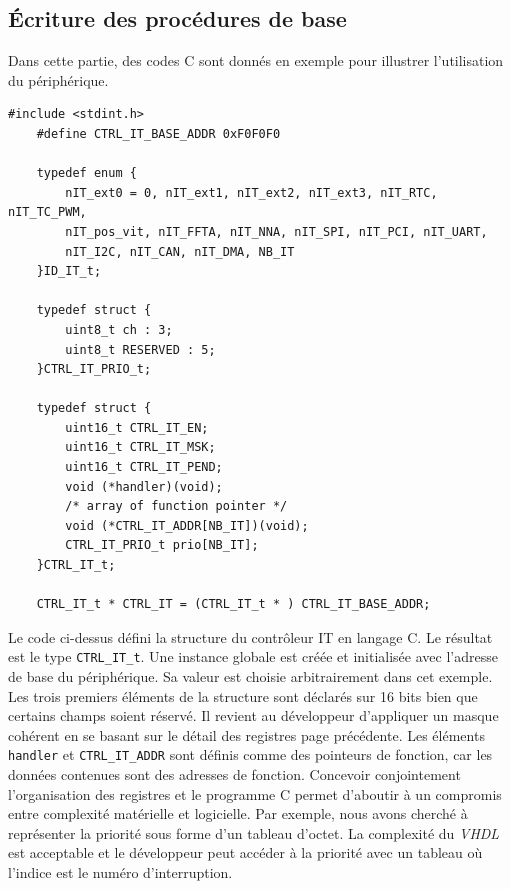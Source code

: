 \subsection{Écriture des procédures de base}
Dans cette partie, des codes C sont donnés en exemple pour illustrer l'utilisation du périphérique.
\begin{lstlisting}[style=CStyle]
	#include <stdint.h>
	#define CTRL_IT_BASE_ADDR 0xF0F0F0
	
	typedef enum {
		nIT_ext0 = 0, nIT_ext1, nIT_ext2, nIT_ext3, nIT_RTC, nIT_TC_PWM,
		nIT_pos_vit, nIT_FFTA, nIT_NNA,	nIT_SPI, nIT_PCI, nIT_UART,
		nIT_I2C, nIT_CAN, nIT_DMA, NB_IT
	}ID_IT_t;
	
	typedef struct {
		uint8_t ch : 3;
		uint8_t RESERVED : 5;
	}CTRL_IT_PRIO_t;

	typedef struct {
		uint16_t CTRL_IT_EN;	
		uint16_t CTRL_IT_MSK;	
		uint16_t CTRL_IT_PEND;	
		void (*handler)(void);  
		/* array of function pointer */
		void (*CTRL_IT_ADDR[NB_IT])(void);
		CTRL_IT_PRIO_t prio[NB_IT];
	}CTRL_IT_t;
	
	CTRL_IT_t * CTRL_IT = (CTRL_IT_t * ) CTRL_IT_BASE_ADDR;
\end{lstlisting}
Le code ci-dessus défini la structure du contrôleur IT en langage C. 
Le résultat est le type \texttt{CTRL\_IT\_t}. 
Une instance globale est créée et initialisée avec l'adresse de base du périphérique.
Sa valeur est choisie arbitrairement dans cet exemple.
Les trois premiers éléments de la structure sont déclarés sur 16 bits bien que certains champs soient réservé.
Il revient au développeur d'appliquer un masque cohérent en se basant sur le détail des registres page précédente.
Les éléments \texttt{handler} et \texttt{CTRL\_IT\_ADDR} sont définis comme des pointeurs de fonction, car les données contenues sont des adresses de fonction.
Concevoir conjointement l'organisation des registres et le programme C permet d'aboutir à un compromis entre complexité matérielle et logicielle.
Par exemple, nous avons cherché à représenter la priorité sous forme d'un tableau d'octet.
La complexité du \textit{VHDL} est acceptable et le développeur peut accéder à la priorité avec un tableau où l'indice est le numéro d'interruption.

